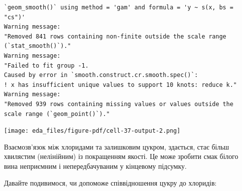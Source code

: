 \documentclass[
  letterpaper,
  DIV=11,
  numbers=noendperiod]{scrreprt}
\newenvironment{Shaded}{\begin{snugshade}}{\end{snugshade}}
\newcommand{\AttributeTok}[1]{\textcolor[rgb]{0.40,0.45,0.13}{#1}}
\newcommand{\CommentTok}[1]{\textcolor[rgb]{0.37,0.37,0.37}{#1}}
\newcommand{\FloatTok}[1]{\textcolor[rgb]{0.68,0.00,0.00}{#1}}
\newcommand{\FunctionTok}[1]{\textcolor[rgb]{0.28,0.35,0.67}{#1}}
\newcommand{\NormalTok}[1]{\textcolor[rgb]{0.00,0.23,0.31}{#1}}
\newcommand{\OtherTok}[1]{\textcolor[rgb]{0.00,0.23,0.31}{#1}}
\newcommand{\SpecialCharTok}[1]{\textcolor[rgb]{0.37,0.37,0.37}{#1}}
\newcommand{\StringTok}[1]{\textcolor[rgb]{0.13,0.47,0.30}{#1}}
\begin{document}
\begin{verbatim}
`geom_smooth()` using method = 'gam' and formula = 'y ~ s(x, bs = "cs")'
Warning message:
"Removed 841 rows containing non-finite outside the scale range (`stat_smooth()`)."
Warning message:
"Failed to fit group -1.
Caused by error in `smooth.construct.cr.smooth.spec()`:
! x has insufficient unique values to support 10 knots: reduce k."
Warning message:
"Removed 939 rows containing missing values or values outside the scale range (`geom_point()`)."
\end{verbatim}

\texttt{[image: eda\_files/figure-pdf/cell-37-output-2.png]}

Взаємозв'язок між хлоридами та залишковим цукром, здається, стає більш
хвилястим (нелінійним) із покращенням якості. Це може зробити смак
білого вина неприємним і непередбачуваним у кінцевому підсумку.

Давайте подивимося, чи допоможе співвідношення цукру до хлоридів:

\begin{Shaded}
\end{Shaded}
\end{document}
